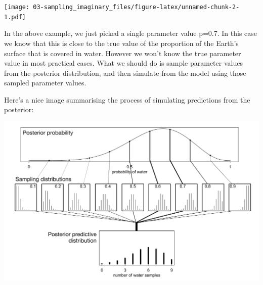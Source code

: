 \documentclass[
]{book}
\begin{document}
\texttt{[image: 03-sampling\_imaginary\_files/figure-latex/unnamed-chunk-2-1.pdf]}

In the above example, we just picked a single parameter value p=0.7. In this case we know that this is close to the true value of the proportion of the Earth's surface that is covered in water. However we won't know the true parameter value in most practical cases. What we should do is sample parameter values from the posterior distribution, and then simulate from the model using those sampled parameter values.

Here's a nice image summarising the process of simulating predictions from the posterior:

\includegraphics{images/Ch03Img01.png}
\end{document}
